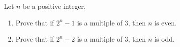 Let $n$ be a positive integer.
\begin{enumerate}
\item[(1)] Prove that if $2^n-1$ is a multiple of $3$, then $n$ is even.
\item[(2)] Prove that if $2^n-2$ is a multiple of $3$, then $n$ is odd.
\end{enumerate}
